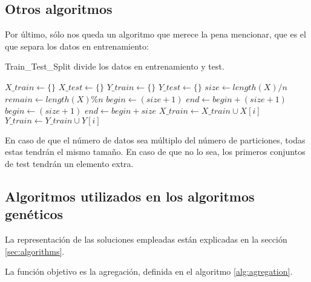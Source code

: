 \documentclass[11pt,a4paper]{article}
\begin{document}
\subsection{Otros algoritmos}

Por último, sólo nos queda un algoritmo que merece la pena mencionar, que es el que separa los datos en entrenamiento: \\
\begin{algorithm}[H]
	\caption{{\sc Train\_Test\_Split} divide los datos en entrenamiento y test.}
	
	$X\_train \gets \{\}$ \;
	$X\_test \gets \{\}$ \;
	$Y\_train \gets \{\}$ \;
	$Y\_test \gets \{\}$ \;
	$size \gets length(X) / n$ \;
	$remain \gets length(X) \% n$ \;
	 {
		$begin \gets (size + 1)$ \;
		$end \gets begin + (size + 1)$ \;
	}  {
		$begin \gets (size + 1)$ \;
		$end \gets begin + size$ \;
	} 
	 {
		 {
			$X\_train \gets X\_train \cup X[i]$ \;
			$Y\_train \gets Y\_train \cup Y[i]$ \;
		} 
	}
	 \;
	 \;
	 \;
	 \;
\end{algorithm}

En caso de que el número de datos sea múltiplo del número de particiones, todas estas tendrán el mismo tamaño. En caso de que no lo sea, los primeros conjuntos de test tendrán un elemento extra.

\subsection{Algoritmos utilizados en los algoritmos genéticos}\label{sec:gen_alg}

La representación de las soluciones empleadas están explicadas en la sección \ref{sec:algorithms}.

La función objetivo es la agregación, definida en el algoritmo \ref{alg:agregation}.
\end{document}
